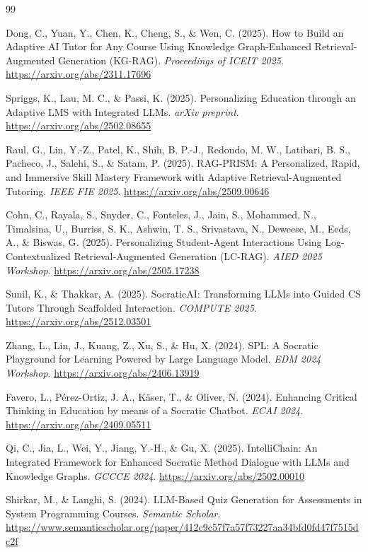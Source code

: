 \documentclass[12pt,a4paper]{report}
\begin{document}
\begin{thebibliography}{99}
\setlength{\itemsep}{6pt}
\RaggedRight

 Dong, C., Yuan, Y., Chen, K., Cheng, S., \& Wen, C. (2025). How to Build an
Adaptive AI Tutor for Any Course Using Knowledge Graph-Enhanced Retrieval-Augmented
Generation (KG-RAG). \emph{Proceedings of ICEIT 2025}.
\url{https://arxiv.org/abs/2311.17696}

 Spriggs, K., Lau, M. C., \& Passi, K. (2025). Personalizing Education through
an Adaptive LMS with Integrated LLMs. \emph{arXiv preprint}.
\url{https://arxiv.org/abs/2502.08655}

 Raul, G., Lin, Y.-Z., Patel, K., Shih, B. P.-J., Redondo, M. W., Latibari, B.
S., Pacheco, J., Salehi, S., \& Satam, P. (2025). RAG-PRISM: A Personalized, Rapid, and
Immersive Skill Mastery Framework with Adaptive Retrieval-Augmented Tutoring.
\emph{IEEE FIE 2025}. \url{https://arxiv.org/abs/2509.00646}

 Cohn, C., Rayala, S., Snyder, C., Fonteles, J., Jain, S., Mohammed, N.,
Timalsina, U., Burriss, S. K., Ashwin, T. S., Srivastava, N., Deweese, M., Eeds, A., \&
Biswas, G. (2025). Personalizing Student-Agent Interactions Using Log-Contextualized
Retrieval-Augmented Generation (LC-RAG). \emph{AIED 2025 Workshop}.
\url{https://arxiv.org/abs/2505.17238}

 Sunil, K., \& Thakkar, A. (2025). SocraticAI: Transforming LLMs into Guided CS
Tutors Through Scaffolded Interaction. \emph{COMPUTE 2025}.
\url{https://arxiv.org/abs/2512.03501}

 Zhang, L., Lin, J., Kuang, Z., Xu, S., \& Hu, X. (2024). SPL: A Socratic
Playground for Learning Powered by Large Language Model. \emph{EDM 2024 Workshop}.
\url{https://arxiv.org/abs/2406.13919}

 Favero, L., P\'erez-Ortiz, J. A., K\"aser, T., \& Oliver, N. (2024). Enhancing
Critical Thinking in Education by means of a Socratic Chatbot. \emph{ECAI 2024}.
\url{https://arxiv.org/abs/2409.05511}

 Qi, C., Jia, L., Wei, Y., Jiang, Y.-H., \& Gu, X. (2025). IntelliChain: An
Integrated Framework for Enhanced Socratic Method Dialogue with LLMs and Knowledge Graphs.
\emph{GCCCE 2024}. \url{https://arxiv.org/abs/2502.00010}

 Shirkar, M., \& Langhi, S. (2024). LLM-Based Quiz Generation for Assessments
in System Programming Courses. \emph{Semantic Scholar}.
\url{https://www.semanticscholar.org/paper/412c9c57f7a57f73227aa34bfd0fd47f7515dc2f}


\end{thebibliography}
\end{document}
